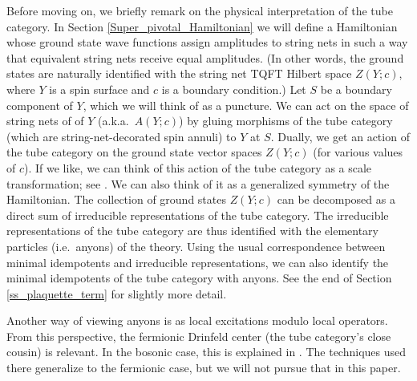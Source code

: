 Before moving on, we briefly remark on the physical interpretation of the tube category. 
In Section \ref{Super_pivotal_Hamiltonian} we will define a Hamiltonian whose ground state wave functions assign amplitudes to string nets in such a way
that equivalent string nets receive equal amplitudes.
(In other words, the ground states are naturally identified with the string net TQFT Hilbert space $Z(Y; c)$,
where $Y$ is a spin surface and $c$ is a boundary condition.)
Let $S$ be a boundary component of $Y$, which we will think of as a puncture.
We can act on the space of string nets of of $Y$ (a.k.a.\ $A(Y; c)$) by gluing morphisms of the tube category 
(which are string-net-decorated spin annuli)
to $Y$ at $S$.
Dually, we get an action of the tube category on the ground state vector spaces $Z(Y; c)$ (for various values of $c$).
If we like, we can think of this action of the tube category as a scale transformation; see \cite{Lan2014}.
We can also think of it as a generalized symmetry of the Hamiltonian.
The collection of ground states $Z(Y; c)$ can be decomposed as a direct sum of irreducible representations of the tube category.
The irreducible representations of the tube category are thus identified with the elementary particles (i.e.\ anyons) of the theory.
Using the usual correspondence between minimal idempotents and irreducible representations, we can also identify
the minimal idempotents of the tube category with anyons.
See the end of Section \ref{ss_plaquette_term} for slightly more detail.

Another way of viewing anyons is as local excitations modulo local operators.
From this perspective, the fermionic Drinfeld center (the tube category's close cousin) is relevant.
In the bosonic case, this is explained in .
The techniques used there generalize to the fermionic case, but we will not pursue that in this paper.

\kwsep





